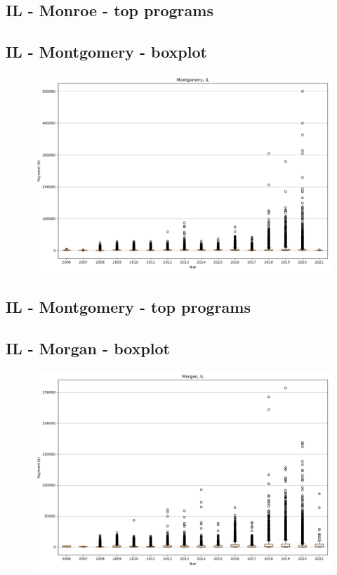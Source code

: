 \subsection*{IL - Monroe - top programs}

\newpage
\subsection*{IL - Montgomery - boxplot}
\begin{figure}[h]
\centering
\includegraphics[width=7in]{../output/boxplots/counties/Montgomery-IL_boxplot.png}
\end{figure}


\subsection*{IL - Montgomery - top programs}

\newpage
\subsection*{IL - Morgan - boxplot}
\begin{figure}[h]
\centering
\includegraphics[width=7in]{../output/boxplots/counties/Morgan-IL_boxplot.png}
\end{figure}



